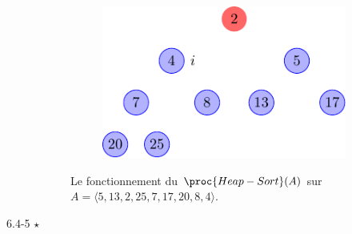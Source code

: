\begin{description}
\begin{ex}
\begin{figure}[t]
\begin{subfigure}[t]{.30\textwidth}
          \centering
          \includegraphics[scale=0.8]{img/6_4-1/6_4-1_10}
          \caption{}\label{fig:6_4-1_10}
        \end{subfigure}
        \caption{Le fonctionnement du $\proc{Heap-Sort}(A)$ sur $A = \langle 5, 13, 2, 25, 7, 17, 20, 8, 4 \rangle$.} 
        \label{fig:Heap-Sort}
      \end{figure}
    \end{ex}
 \textit{}
    \begin{exrev}
      
    \end{exrev}
 \textit{}
    \begin{exrev}
      
    \end{exrev}
 \textit{}
    \begin{exrev}
      
    \end{exrev}
  \item[6.4-5 $\star$]  \textit{}
    \begin{exrev}
      
    \end{exrev}
\end{description}
